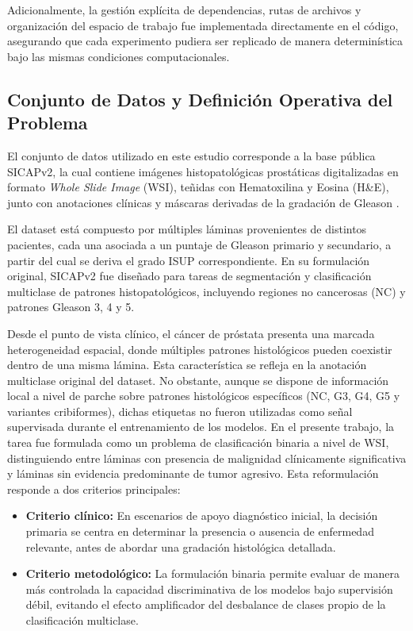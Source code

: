 Adicionalmente, la gestión explícita de dependencias, rutas de archivos y organización del espacio de trabajo fue implementada directamente en el código, asegurando que cada experimento pudiera ser replicado de manera determinística bajo las mismas condiciones computacionales.

\subsection{Conjunto de Datos y Definición Operativa del Problema}
\label{subsec:dataset_problema}
El conjunto de datos utilizado en este estudio corresponde a la base pública SICAPv2, la cual contiene imágenes histopatológicas prostáticas digitalizadas en formato \textit{Whole Slide Image} (WSI), teñidas con Hematoxilina y Eosina (H\&E), junto con anotaciones clínicas y máscaras derivadas de la gradación de Gleason \cite{Silva-Rodríguez_2020Data}.\newline

El dataset está compuesto por múltiples láminas provenientes de distintos pacientes, cada una asociada a un puntaje de Gleason primario y secundario, a partir del cual se deriva el grado ISUP correspondiente. En su formulación original, SICAPv2 fue diseñado para tareas de segmentación y clasificación multiclase de patrones histopatológicos, incluyendo regiones no cancerosas (NC) y patrones Gleason 3, 4 y 5.\newline

Desde el punto de vista clínico, el cáncer de próstata presenta una marcada heterogeneidad espacial, donde múltiples patrones histológicos pueden coexistir dentro de una misma lámina. Esta característica se refleja en la anotación multiclase original del dataset. No obstante, aunque se dispone de información local a nivel de parche sobre patrones histológicos específicos (NC, G3, G4, G5 y variantes cribiformes), dichas etiquetas no fueron utilizadas como señal supervisada durante el entrenamiento de los modelos. En el presente trabajo, la tarea fue formulada como un problema de clasificación binaria a nivel de WSI, distinguiendo entre láminas con presencia de malignidad clínicamente significativa y láminas sin evidencia predominante de tumor agresivo. Esta reformulación responde a dos criterios principales:

\begin{itemize}
    \item \textbf{Criterio clínico:} En escenarios de apoyo diagnóstico inicial, la decisión primaria se centra en determinar la presencia o ausencia de enfermedad relevante, antes de abordar una gradación histológica detallada.
    \item \textbf{Criterio metodológico:} La formulación binaria permite evaluar de manera más controlada la capacidad discriminativa de los modelos bajo supervisión débil, evitando el efecto amplificador del desbalance de clases propio de la clasificación multiclase.
\end{itemize}

